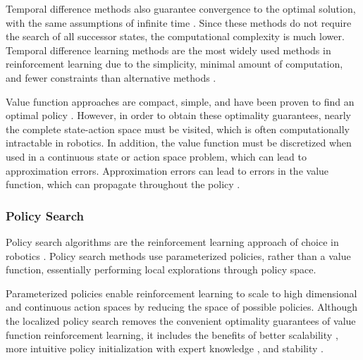 \documentclass{article}
\begin{document}
Temporal difference methods also guarantee convergence to the optimal solution, with the same assumptions of infinite time \cite{Russell:2009:AIM:1671238}. Since these methods do not require the search of all successor states, the computational complexity is much lower. Temporal difference learning methods are the most widely used methods in reinforcement learning due to the simplicity, minimal amount of computation, and fewer constraints than alternative methods \cite{Sutton98reinforcementlearning}.

Value function approaches are compact, simple, and have been proven to find an optimal policy \cite{raey}. However, in order to obtain these optimality guarantees, nearly the complete state-action space must be visited, which is often computationally intractable in robotics. In addition, the value function must be discretized when used in a continuous state or action space problem, which can lead to approximation errors. Approximation errors can lead to errors in the value function, which can propagate throughout the policy \cite{journals/ftrob/DeisenrothNP13}.

\subsubsection{Policy Search}

Policy search algorithms are the reinforcement learning approach of choice in robotics \cite{journals/ftrob/DeisenrothNP13, raey}. Policy search methods use parameterized policies, rather than a value function, essentially performing local explorations through policy space. %


Parameterized policies enable reinforcement learning to scale to high dimensional and continuous action spaces by reducing the space of possible policies. Although the localized policy search removes the convenient optimality guarantees of value function reinforcement learning, it includes the benefits of better scalability \cite{journals/ftrob/DeisenrothNP13, raey}, more intuitive policy initialization with expert knowledge \cite{4058714}, and stability \cite{Bertsekas:2000:DPO:517430}. 
\end{document}
